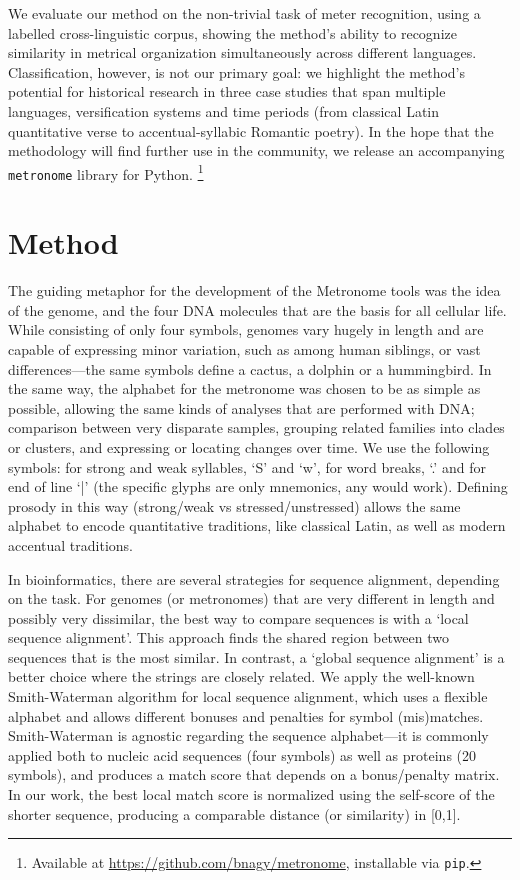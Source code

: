 \documentclass[
    hf
]{ceurart}
\begin{document}
We evaluate our method on the non-trivial task of meter recognition, using a labelled cross-linguistic corpus, showing the method's ability to recognize similarity in metrical organization simultaneously across different languages. Classification, however, is not our primary goal: we highlight the method's potential for historical research in three case studies that span multiple languages, versification systems and time periods (from classical Latin quantitative verse to accentual-syllabic Romantic poetry). In the hope that the methodology will find further use in the community, we release an accompanying \texttt{metronome} library for Python.%
%
\footnote{Available at \url{https://github.com/bnagy/metronome}, installable via \texttt{pip}.}

\section{Method}

The guiding metaphor for the development of the Metronome tools was the idea of the genome, and the four DNA molecules that are the basis for all cellular life. While consisting of only four symbols, genomes vary hugely in length and are capable of expressing minor variation, such as among human siblings, or vast differences---the same symbols define a cactus, a dolphin or a hummingbird. In the same way, the alphabet for the metronome was chosen to be as simple as possible, allowing the same kinds of analyses that are performed with DNA; comparison between very disparate samples, grouping related families into clades or clusters, and expressing or locating changes over time. We use the following symbols: for strong and weak syllables, `S' and `w', for word breaks, `.' and for end of line `|' (the specific glyphs are only mnemonics, any would work). Defining prosody in this way (strong/weak vs stressed/unstressed) allows the same alphabet to encode quantitative traditions, like classical Latin, as well as modern accentual traditions.

In bioinformatics, there are several  strategies for sequence alignment, depending on the task. For genomes (or metronomes) that are very different in length and possibly very dissimilar, the best way to compare sequences is with a `local sequence alignment'. This approach finds the shared region between two sequences that is the most similar. In contrast, a `global sequence alignment' is a better choice where the strings are closely related. We apply the well-known Smith-Waterman algorithm \cite{smith_identification_1981} for local sequence alignment, which uses a flexible alphabet and allows different bonuses and penalties for symbol (mis)matches. Smith-Waterman is agnostic regarding the sequence alphabet---it is commonly applied both to nucleic acid sequences (four symbols) as well as proteins (20 symbols), and produces a match score that depends on a bonus/penalty matrix. In our work, the best local match score is normalized using the self-score of the shorter sequence, producing a comparable distance (or similarity) in [0,1].
\end{document}
